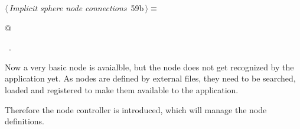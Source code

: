 \documentclass[
    a4paper,      %
    10pt,         %
    openright,    %
    notitlepage,  %
    parskip=half, %
]{scrreprt}       %
\theoremstyle{definition}                    %
\begin{document}
\begin{flushleft} \small
\begin{minipage}{\linewidth}\label{scrap96}\raggedright\small
{} $\langle\,${\itshape Implicit sphere node connections}\nobreak\ {\footnotesize {59b}}$\,\rangle\equiv$
\vspace{-1exm}
\begin{list}{}{} \item
\mbox{}@{\NWsep}
\end{list}
\vspace{-1.5ex}
\footnotesize
\begin{list}{}{\setlength{\itemsep}{-\parsep}\setlength{\itemindent}{-\leftmargin}}
\item \NWtxtMacroRefIn\ .

\item{}
\end{list}
\end{minipage}\vspace{4ex}
\end{flushleft}
Now a very basic node is avaialble, but the node does not get recognized by the
application yet. As nodes are defined by external files, they need to be
searched, loaded and registered to make them available to the application.

Therefore the node controller is introduced, which will manage the node
definitions.
\end{document}
